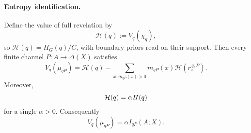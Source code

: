 \paragraph{Entropy identification.}

\begin{lemma}
\label{pt:lem:faddeevsketch}
Define the value of full revelation by
\[
 \mathcal H(q):=V_q(\chi_q),
\]
so $\mathcal H(q)=H_G(q)/C$, with boundary priors read on their support.
Then every finite channel
$P:A\to\Delta(X)$ satisfies
\begin{equation}
 V_q(\mu_{qP})
 =\mathcal H(q)-\sum_{x:m_{qP}(x)>0}
    m_{qP}(x)\mathcal H(r_x^{\,q,P}).
\tag{ER}\label{pt:eq:entropy-reduction}
\end{equation}
Moreover,
\[
 \mathcal H(q)=\alpha H(q)
\]
for a single $\alpha>0$.  Consequently
\[
 V_q(\mu_{qP})=\alpha I_{qP}(A;X).
\tag{MI}\label{pt:eq:value-MI}
\]
\end{lemma}

